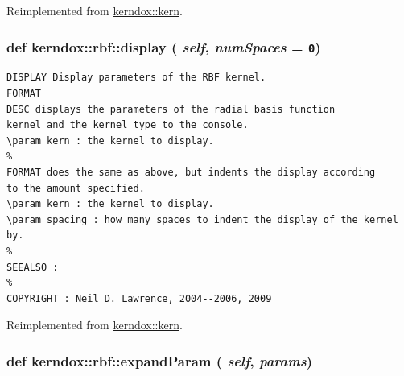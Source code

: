 Reimplemented from \hyperlink{classkerndox_1_1kern}{kerndox::kern}.\hypertarget{classkerndox_1_1rbf_3559f5ba5512e4aa8a602dad0fa941fc}{
\subsubsection[{display}]{\setlength{\rightskip}{0pt plus 5cm}def kerndox::rbf::display ( {\em self}, \/   {\em numSpaces} = {\tt 0})}}
\label{classkerndox_1_1rbf_3559f5ba5512e4aa8a602dad0fa941fc}




\footnotesize\begin{verbatim}DISPLAY Display parameters of the RBF kernel.
FORMAT
DESC displays the parameters of the radial basis function
kernel and the kernel type to the console.
\param kern : the kernel to display.
%
FORMAT does the same as above, but indents the display according
to the amount specified.
\param kern : the kernel to display.
\param spacing : how many spaces to indent the display of the kernel by.
%
SEEALSO :
%
COPYRIGHT : Neil D. Lawrence, 2004--2006, 2009

\end{verbatim}
\normalsize
 

Reimplemented from \hyperlink{classkerndox_1_1kern}{kerndox::kern}.\hypertarget{classkerndox_1_1rbf_847349971e97766b4fe4db1d4083708c}{
\subsubsection[{expandParam}]{\setlength{\rightskip}{0pt plus 5cm}def kerndox::rbf::expandParam ( {\em self}, \/   {\em params})}}
\label{classkerndox_1_1rbf_847349971e97766b4fe4db1d4083708c}





